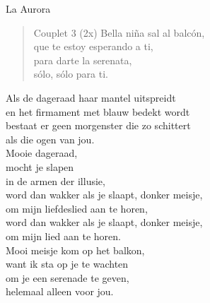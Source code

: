 \begin{song}[vals]{La Aurora}
\begin{verse}{Couplet 3 (2x)}
Bella niña sal al balcón,\\
que te estoy esperando a ti,\\
para darte la serenata,\\
sólo, sólo para ti. \hspace{1em}\hspace{2em}\\
\end{verse}
\begin{translation}
Als de dageraad haar mantel uitspreidt\\
en het firmament met blauw bedekt wordt\\
bestaat er geen morgenster die zo schittert\\
als die ogen van jou.\\\vspace{1em}
Mooie dageraad,\\
mocht je slapen\\
in de armen der illusie,\\
word dan wakker als je slaapt, donker meisje,\\
om mijn liefdeslied aan te horen,\\
word dan wakker als je slaapt, donker meisje,\\
om mijn lied aan te horen.\\\vspace{1em}
Mooi meisje kom op het balkon,\\
want ik sta op je te wachten\\
om je een serenade te geven,\\
helemaal alleen voor jou.\\
\end{translation}
\end{song}
